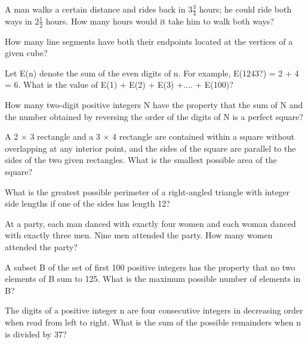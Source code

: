 \item A man walks a certain distance and rides back in $3\frac{3}{4}$ hours; he could ride both ways in $2\frac{1}{2}$ hours. How many hours would it take him to walk both ways?

\item How many line segments have both their endpoints located at the vertices of a given cube?

\item Let E(n) denote the sum of the even digits of n. For example, E(1243?) = 2 + 4 = 6. What is the value of E(1) + E(2) + E(3) +.... + E(100)?

\item How many two-digit positive integers N have the property that the sum of N and the number obtained by reversing the order of the digits of N is a perfect square?

\item A 2 $\times$ 3 rectangle and a 3 $\times$ 4 rectangle are contained within a square without overlapping at any interior point, and the sides of the square are parallel to the sides of the two given rectangles. What is the smallest possible area of the square?

\item What is the greatest possible perimeter of a right-angled triangle with integer side lengths if one of the sides has length 12?

\item At a party, each man danced with exactly four women and each woman danced with exactly three men. Nine men attended the party. How many women attended the party?

\item A subset B of the set of first 100 positive integers has the property that no two elements of B sum to 125. What is the maximum possible number of elements in B?

\item The digits of a positive integer n are four consecutive integers in decreasing order when read from left to right. What is the sum of the possible remainders when n is divided by 37?
